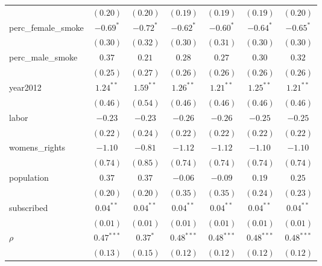 \begin{table}[!h]
\begin{center}
\begin{tabular}{l c c c c c c }
                        & $(0.20)$     & $(0.20)$    & $(0.19)$     & $(0.19)$     & $(0.19)$     & $(0.20)$     \\
perc\_female\_smoke     & $-0.69^{*}$  & $-0.72^{*}$ & $-0.62^{*}$  & $-0.60^{*}$  & $-0.64^{*}$  & $-0.65^{*}$  \\
                        & $(0.30)$     & $(0.32)$    & $(0.30)$     & $(0.31)$     & $(0.30)$     & $(0.30)$     \\
perc\_male\_smoke       & $0.37$       & $0.21$      & $0.28$       & $0.27$       & $0.30$       & $0.32$       \\
                        & $(0.25)$     & $(0.27)$    & $(0.26)$     & $(0.26)$     & $(0.26)$     & $(0.26)$     \\
year2012                & $1.24^{**}$  & $1.59^{**}$ & $1.26^{**}$  & $1.21^{**}$  & $1.25^{**}$  & $1.21^{**}$  \\
                        & $(0.46)$     & $(0.54)$    & $(0.46)$     & $(0.46)$     & $(0.46)$     & $(0.46)$     \\
labor                   & $-0.23$      & $-0.23$     & $-0.26$      & $-0.26$      & $-0.25$      & $-0.25$      \\
                        & $(0.22)$     & $(0.24)$    & $(0.22)$     & $(0.22)$     & $(0.22)$     & $(0.22)$     \\
womens\_rights          & $-1.10$      & $-0.81$     & $-1.12$      & $-1.12$      & $-1.10$      & $-1.10$      \\
                        & $(0.74)$     & $(0.85)$    & $(0.74)$     & $(0.74)$     & $(0.74)$     & $(0.74)$     \\
population              & $0.37$       & $0.37$      & $-0.06$      & $-0.09$      & $0.19$       & $0.25$       \\
                        & $(0.20)$     & $(0.20)$    & $(0.35)$     & $(0.35)$     & $(0.24)$     & $(0.23)$     \\
subscribed              & $0.04^{**}$  & $0.04^{**}$ & $0.04^{**}$  & $0.04^{**}$  & $0.04^{**}$  & $0.04^{**}$  \\
                        & $(0.01)$     & $(0.01)$    & $(0.01)$     & $(0.01)$     & $(0.01)$     & $(0.01)$     \\
$\rho$                  & $0.47^{***}$ & $0.37^{*}$  & $0.48^{***}$ & $0.48^{***}$ & $0.48^{***}$ & $0.48^{***}$ \\
                        & $(0.13)$     & $(0.15)$    & $(0.12)$     & $(0.12)$     & $(0.12)$     & $(0.12)$     \\

\end{tabular}
\end{center}
\end{table}
